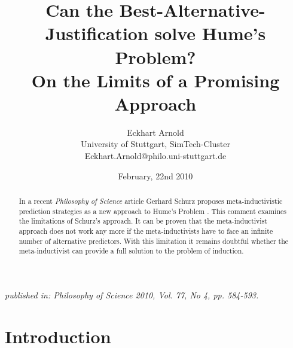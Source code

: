 \documentclass[12pt, a4paper]{article}
\numberwithin{equation}{section}
\begin{document}
 

\title{Can the Best-Alternative-Justification solve Hume's Problem?
\\On the Limits of a Promising Approach}


\author{
{\large Eckhart Arnold}
\\{\normalsize University of Stuttgart, SimTech-Cluster}
\\{\small Eckhart.Arnold@philo.uni-stuttgart.de}
}

\date{February, 22nd 2010}

\maketitle

\begin{center}
{\em published in: Philosophy of Science 2010, Vol. 77, No 4, pp. 584-593.}
\end{center}

\begin{abstract}
In a recent {\em Philosophy of Science} article Gerhard Schurz
proposes meta-inductivistic prediction strategies 
as a new approach to Hume's Problem \cite[]{schurz:2008}. This comment
examines the limitations of Schurz's approach. 
It can be proven that
the meta-inductivist approach does not work any more if the meta-inductivists
have to face an infinite number of alternative predictors. With this
limitation it remains doubtful whether the meta-inductivist can
provide a full solution to the problem of induction.
\end{abstract}

\newpage

\tableofcontents 

\section{Introduction}
\end{document}
